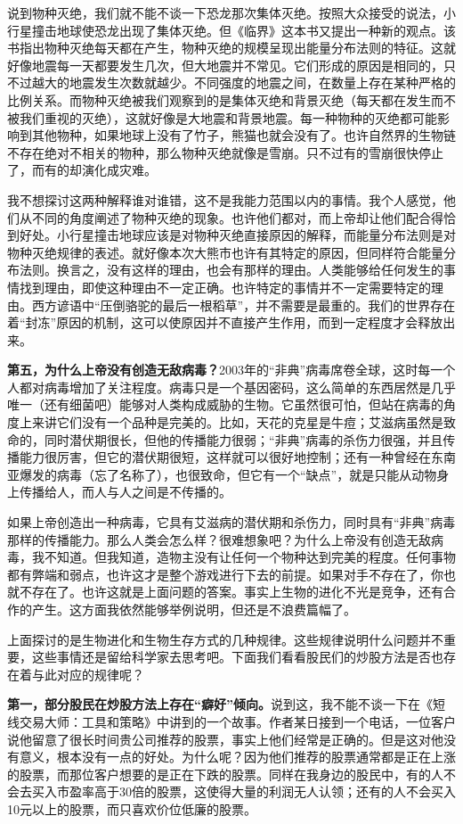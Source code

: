 说到物种灭绝，我们就不能不谈一下恐龙那次集体灭绝。按照大众接受的说法，小行星撞击地球使恐龙出现了集体灭绝。但《临界》这本书又提出一种新的观点。该书指出物种灭绝每天都在产生，物种灭绝的规模呈现出能量分布法则的特征。这就好像地震每一天都要发生几次，但大地震并不常见。它们形成的原因是相同的，只不过越大的地震发生次数就越少。不同强度的地震之间，在数量上存在某种严格的比例关系。而物种灭绝被我们观察到的是集体灭绝和背景灭绝（每天都在发生而不被我们重视的灭绝），这就好像是大地震和背景地震。每一种物种的灭绝都可能影响到其他物种，如果地球上没有了竹子，熊猫也就会没有了。也许自然界的生物链不存在绝对不相关的物种，那么物种灭绝就像是雪崩。只不过有的雪崩很快停止了，而有的却演化成灾难。

我不想探讨这两种解释谁对谁错，这不是我能力范围以内的事情。我个人感觉，他们从不同的角度阐述了物种灭绝的现象。也许他们都对，而上帝却让他们配合得恰到好处。小行星撞击地球应该是对物种灭绝直接原因的解释，而能量分布法则是对物种灭绝规律的表述。就好像本次大熊市也许有其特定的原因，但同样符合能量分布法则。换言之，没有这样的理由，也会有那样的理由。人类能够给任何发生的事情找到理由，即使这种理由不一定正确。也许特定的事情并不一定需要特定的理由。西方谚语中“压倒骆驼的最后一根稻草”，并不需要是最重的。我们的世界存在着“封冻”原因的机制，这可以使原因并不直接产生作用，而到一定程度才会释放出来。

\textbf{第五，为什么上帝没有创造无敌病毒？}2003年的“非典”病毒席卷全球，这时每一个人都对病毒增加了关注程度。病毒只是一个基因密码，这么简单的东西居然是几乎唯一（还有细菌吧）能够对人类构成威胁的生物。它虽然很可怕，但站在病毒的角度上来讲它们没有一个品种是完美的。比如，天花的克星是牛痘；艾滋病虽然是致命的，同时潜伏期很长，但他的传播能力很弱；“非典”病毒的杀伤力很强，并且传播能力很厉害，但它的潜伏期很短，这样就可以很好地控制；还有一种曾经在东南亚爆发的病毒（忘了名称了），也很致命，但它有一个“缺点”，就是只能从动物身上传播给人，而人与人之间是不传播的。

如果上帝创造出一种病毒，它具有艾滋病的潜伏期和杀伤力，同时具有“非典”病毒那样的传播能力。那么人类会怎么样？很难想象吧？为什么上帝没有创造无敌病毒，我不知道。但我知道，造物主没有让任何一个物种达到完美的程度。任何事物都有弊端和弱点，也许这才是整个游戏进行下去的前提。如果对手不存在了，你也就不存在了。也许这就是上面问题的答案。事实上生物的进化不光是竞争，还有合作的产生。这方面我依然能够举例说明，但还是不浪费篇幅了。

上面探讨的是生物进化和生物生存方式的几种规律。这些规律说明什么问题并不重要，这些事情还是留给科学家去思考吧。下面我们看看股民们的炒股方法是否也存在着与此对应的规律呢？

\textbf{第一，部分股民在炒股方法上存在“癖好”倾向。}说到这，我不能不谈一下在《短线交易大师：工具和策略》中讲到的一个故事。作者某日接到一个电话，一位客户说他留意了很长时间贵公司推荐的股票，事实上他们经常是正确的。但是这对他没有意义，根本没有一点的好处。为什么呢？因为他们推荐的股票通常都是正在上涨的股票，而那位客户想要的是正在下跌的股票。同样在我身边的股民中，有的人不会去买入市盈率高于30倍的股票，这使得大量的利润无人认领；还有的人不会买入10元以上的股票，而只喜欢价位低廉的股票。

